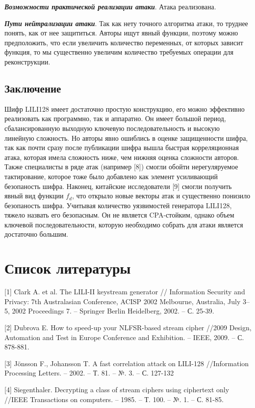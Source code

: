 \documentclass[colorthm]{./civarticle}
\begin{document}
    \textbf{\emph{Возможности практической реализации атаки}}. Атака реализована.
    
    \textbf{\emph{Пути нейтрализации атаки}}. Так как нету точного алгоритма атаки, то труднее понять, как от нее защититься. Авторы ищут явный функции, поэтому можно предположить, что если увеличить количество переменных, от которых зависит функция, то мы существенно увеличим количество требуемых операции для реконструкции.

\subsection{Заключение}

Шифр LILI128 имеет достаточно простую конструкцию, его можно эффективно реализовать как программно, так и аппаратно. Он имеет большой период, сбалансированную выходную ключевую последовательность и высокую линейную сложность. Но авторы явно ошиблись в оценке защищенности шифра, так как почти сразу после публикации шифра вышла быстрая корреляционная атака, которая имела сложность ниже, чем нижняя оценка сложности авторов. Также специалисты в ряде атак (например [8]) смогли обойти нерегуляруемое тактирование, которое тоже было добавлено как элемент усиливающий безопаность шифра. Наконец, китайские исследователи [9] смогли получить явный вид функции $f_d$, что открыло новые векторы атак и существенно понизило безопаность шифра. Учитывая количество уязвимостей генератора LILI128, тяжело назвать его безопасным. Он не является CPA-стойким, однако объем ключевой последовательности, которую необходимо собрать для атаки является достаточно большим.

\section{Список литературы}

[1] Clark A. et al. The LILI-II keystream generator // Information Security and Privacy: 7th Australasian Conference, ACISP 2002 Melbourne, Australia, July 3–5, 2002 Proceedings 7. – Springer Berlin Heidelberg, 2002. – С. 25-39.

[2] Dubrova E. How to speed-up your NLFSR-based stream cipher //2009 Design, Automation and Test in Europe Conference and Exhibition. – IEEE, 2009. – С. 878-881.

[3] Jönsson F., Johansson T. A fast correlation attack on LILI-128 //Information Processing Letters. – 2002. – Т. 81. – №. 3. – С. 127-132

[4] Siegenthaler. Decrypting a class of stream ciphers using ciphertext only //IEEE Transactions on computers. – 1985. – Т. 100. – №. 1. – С. 81-85.
\end{document}
